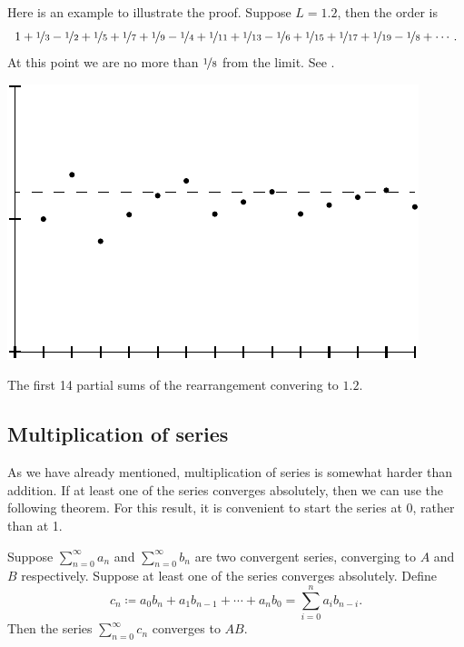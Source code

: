 \begin{example}
Here is an example to illustrate the proof.  Suppose $L=1.2$, then the order
is
\begin{equation*}
1+\nicefrac{1}{3}-\nicefrac{1}{2}+\nicefrac{1}{5}+\nicefrac{1}{7}+\nicefrac{1}{9}-\nicefrac{1}{4}+\nicefrac{1}{11}+\nicefrac{1}{13}-\nicefrac{1}{6}
+\nicefrac{1}{15}+\nicefrac{1}{17}+\nicefrac{1}{19} - \nicefrac{1}{8} + \cdots .
\end{equation*}
At this point we are no more than $\nicefrac{1}{8}$ from the limit.
See .
\begin{myfigureht}
\includegraphics{figures/ser-rearrange}
\caption{The first 14 partial sums of the rearrangement convering
to $1.2$.\label{fig:serrearrange}}
\end{myfigureht}
\end{example}

\subsection{Multiplication of series}

As we have
already mentioned,
multiplication of series is somewhat harder than addition.
If at least one of the series converges
absolutely, then we can use the following theorem.  For this result, it is
convenient to start the series at 0, rather than at 1.

\begin{thm}
Suppose $\sum_{n=0}^\infty a_n$ and $\sum_{n=0}^\infty b_n$ are two convergent series, converging
to $A$ and $B$ respectively.  Suppose at least one of the series
converges absolutely.  Define
\begin{equation*}
c_n \coloneqq a_0 b_n + a_1 b_{n-1} + \cdots + a_n b_0 = \sum_{i=0}^n a_i b_{n-i} .
\end{equation*}
Then the series $\sum_{n=0}^\infty c_n$
converges to $AB$.
\end{thm}

